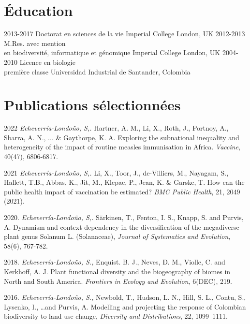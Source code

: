 \documentclass[icon]{twentysecondcv}
\begin{document}
\section{Éducation}

\begin{twenty}
  \twentyitem
    {2013-2017}
    {Doctorat  {\normalfont en sciences de la vie}}
    {Imperial College London, UK}
    {}
  \twentyitem
    {2012-2013}
    {M.Res. avec mention  \\  {\normalfont en biodiversité, informatique et génomique}}
    {Imperial College London, UK}
    {}
  \twentyitem
    {2004-2010}
    {Licence en biologie  \\  première classe}
    {Universidad Industrial de Santander, Colombia}
    {}
 \end{twenty}
 
 
\section{Publications sélectionnées}

\small 2022 \textit{Echeverr\'ia-Londo\~no, S,.}  Hartner, A. M., Li, X., Roth, J., Portnoy, A., Sbarra, A. N., ... \& Gaythorpe, K. A. Exploring the subnational inequality and heterogeneity of the impact of routine measles immunisation in Africa. \textit{Vaccine}, 40(47), 6806-6817. 

\small  2021 \textit{Echeverr\'ia-Londo\~no, S,.}  Li, X., Toor, J., de-Villiers, M., Nayagam, S., Hallett, T.B., Abbas, K., Jit, M., Klepac, P., Jean, K. \&  Garske, T. How can the public health impact of vaccination be estimated? \textit{BMC Public Health}, 21, 2049 (2021).

\small  2020. \textit{Echeverr\'ia-Londo\~no, S,.}  S{\"a}rkinen, T., Fenton, I. S., Knapp, S. and Purvis, A. Dynamism and context dependency in the diversification of the megadiverse plant genus Solanum L. (Solanaceae), \textit{Journal of Systematics and Evolution},  58(6), 767-782. 

\small  2018. \textit{Echeverr\'ia-Londo\~no, S.,} Enquist. B. J., Neves, D. M., Violle, C. and Kerkhoff, A. J. Plant functional diversity and the biogeography of biomes in North and South America. \textit{Frontiers in Ecology and Evolution}, 6(DEC), 219.

\small  2016. \textit{Echeverr\'ia-Londo\~no, S.,} Newbold, T., Hudson, L. N., Hill, S. L., Contu, S., Lysenko, I., \dots and Purvis, A. Modelling and projecting the response of Colombian biodiversity to land-use change, \textit{Diversity and Distributions}, 22, 1099--1111. 
\end{document}
